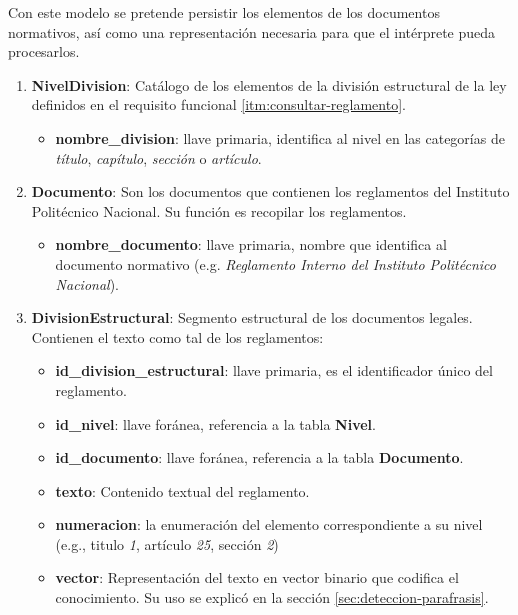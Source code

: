Con este modelo se pretende persistir los elementos de los documentos normativos, así como una representación necesaria para que el intérprete pueda procesarlos.

\begin{enumerate}
    \item \textbf{NivelDivision}: Catálogo de los elementos de la división estructural de la ley definidos en el requisito funcional \ref{itm:consultar-reglamento}.
    
    \begin{itemize}
        \item \textbf{nombre\_division}: llave primaria, identifica al nivel en las categorías de \textit{título}, \textit{capítulo}, \textit{sección} o \textit{artículo}.
    \end{itemize}
    
   \item \textbf{Documento}: Son los documentos que contienen los reglamentos del Instituto Politécnico Nacional. Su función es recopilar los reglamentos.
   
   \begin{itemize}
        \item \textbf{nombre\_documento}: llave primaria, nombre que identifica al documento normativo (e.g. \textit{Reglamento Interno del Instituto Politécnico Nacional}).
    \end{itemize}
   
   \item \textbf{DivisionEstructural}: Segmento estructural de los documentos legales. Contienen el texto como tal de los reglamentos:
   
   \begin{itemize}
        \item \textbf{id\_division\_estructural}: llave primaria, es el identificador único del reglamento.
        \item \textbf{id\_nivel}: llave foránea, referencia a la tabla \textbf{Nivel}.
        \item \textbf{id\_documento}: llave foránea, referencia a la tabla \textbf{Documento}.
        \item \textbf{texto}: Contenido textual del reglamento.
        \item \textbf{numeracion}: la enumeración del elemento correspondiente a su nivel (e.g., titulo \textit{1}, artículo \textit{25}, sección \textit{2})
        \item \textbf{vector}: Representación del texto en vector binario que codifica el conocimiento. Su uso se explicó en la sección \ref{sec:deteccion-parafrasis}. 
    \end{itemize}
   

\end{enumerate}
